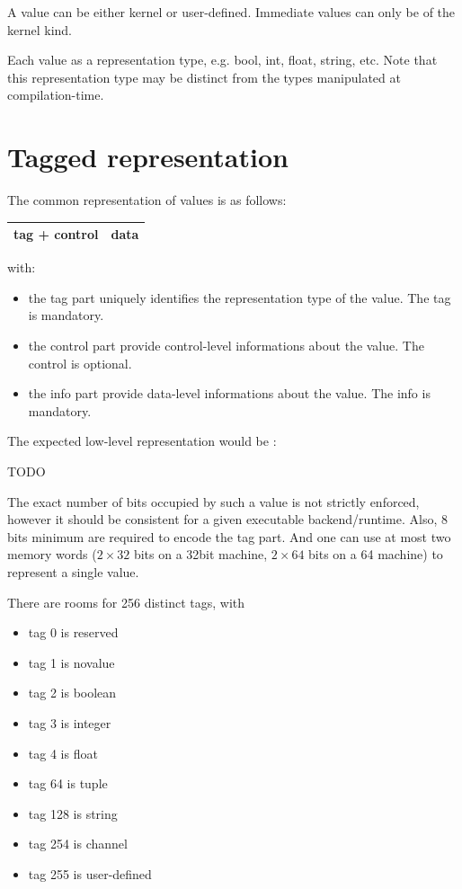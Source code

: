 \documentclass[a4paper,11pt]{article}
\begin{document}
A value can be either kernel or user-defined. Immediate values
 can only be of the kernel kind.

Each value as a representation type, e.g. bool, int, float, string, etc.
Note that this representation type may be distinct from the types
manipulated at compilation-time.

\section{Tagged representation}

The common representation of  values is as follows:

\begin{tabular}{|l|l|}
\hline
tag + control & data \\
\hline
\end{tabular}

with:

\begin{itemize}
\item the tag part uniquely identifies the representation type of the value. The tag is mandatory.
\item the control part provide control-level informations about the value. The control is optional.
\item the info part provide data-level informations about the value. The info is mandatory.
\end{itemize}

The expected low-level representation would be :

TODO


The exact number of bits occupied by such a value is not strictly enforced, 
however it should be consistent for a given executable backend/runtime. 
Also, 8 bits minimum are required to encode the tag part.
And one can use at most two memory words ($2\times 32$ bits on a 32bit machine, $2 \times 64$ bits on a 64 machine) to
represent a single value.

There are rooms for 256 distinct tags, with
\begin{itemize}
\item tag 0 is reserved
\item tag 1 is novalue
\item tag 2 is boolean
\item tag 3 is integer
\item tag 4 is float
\item tag 64 is tuple
\item tag 128 is string
\item tag 254 is channel
\item tag 255 is user-defined
\end{itemize}
\end{document}
